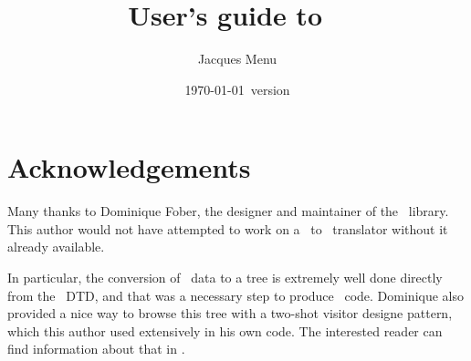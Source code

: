 \documentclass[12pt,a4paper]{article}
\begin{document}


\title{
User's guide to \xmlToLy\ \\[5pt]
}

\newsavebox{\authorBox}

\author{
Jacques Menu 
}

\date {\normalsize \today\ version}

\maketitle
\thispagestyle{fancy} %


\section{Acknowledgements}

Many thanks to Dominique Fober, the designer and maintainer of the \lib\ library. This author would not have attempted to work on a \mxml\ to \lily\ translator without it already available.

In particular, the conversion of \mxml\ data to a tree is extremely well done directly from the \mxml\ DTD, and that was a necessary step to produce \lily\ code. Dominique also provided a nice way to browse this tree with a two-shot visitor designe pattern, which this author used extensively in his own code. The interested reader can find information about that in .
\end{document}
